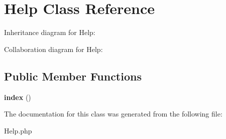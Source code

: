 \hypertarget{class_help}{}\section{Help Class Reference}
\label{class_help}


Inheritance diagram for Help\+:


Collaboration diagram for Help\+:
\subsection*{Public Member Functions}
\begin{DoxyCompactItemize}
\item 
\mbox{\label{class_help_a149eb92716c1084a935e04a8d95f7347}} 
{\bfseries index} ()
\end{DoxyCompactItemize}


The documentation for this class was generated from the following file\+:\begin{DoxyCompactItemize}
\item 
Help.\+php\end{DoxyCompactItemize}
